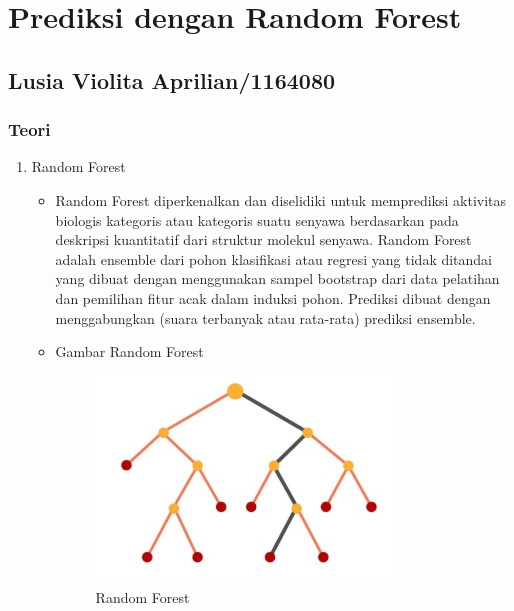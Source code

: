 \chapter{Prediksi dengan Random Forest}

\section{Lusia Violita Aprilian/1164080}
\subsection{Teori}
\begin{enumerate}
\item Random Forest
	\begin{itemize}
	\item Random Forest diperkenalkan dan diselidiki untuk memprediksi aktivitas biologis kategoris atau kategoris suatu senyawa berdasarkan pada deskripsi kuantitatif dari struktur molekul senyawa. Random Forest adalah ensemble dari pohon klasifikasi atau regresi yang tidak ditandai yang dibuat dengan menggunakan sampel bootstrap dari data pelatihan dan pemilihan fitur acak dalam induksi pohon. Prediksi dibuat dengan menggabungkan (suara terbanyak atau rata-rata) prediksi ensemble.
	\item Gambar Random Forest
		\begin{figure}[!hbtp]
		\centering
		\includegraphics[scale=0.5]{figures/j1.jpg}
		\caption{Random Forest}
		\label{contoh}
		\end{figure}
	\end{itemize}


\end{enumerate}
